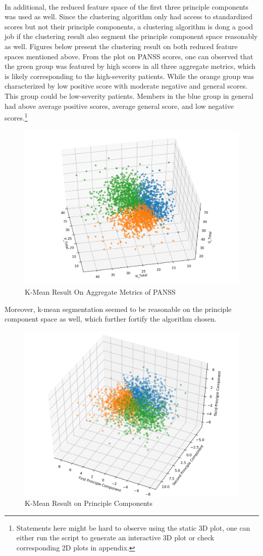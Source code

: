 \documentclass[11pt]{article}
\begin{document}
	\paragraph{} In additional, the reduced feature space of the first three principle components was used as well. Since the clustering algorithm only had access to standardized scores but not their principle components, a clustering algorithm is dong a good job if the clustering result also segment the principle component space reasonably as well. Figures below present the clustering result on both reduced feature spaces mentioned above. From the plot on PANSS scores, one can observed that the green group was featured by high scores in all three aggregate metrics, which is likely corresponding to the high-severity patients.	While the orange group was characterized by low positive score with moderate negative and general scores. This group could be low-severity patients. Members in the blue group in general had above average positive scores, average general score, and low negative scores.\footnote{Statements here might be hard to observe using the static 3D plot, one can either run the script to generate an interactive 3D plot or check corresponding 2D plots in appendix.}
	\begin{figure}[H]
		\centering
		\includegraphics[width=0.7\linewidth]{figures/kmean_3.png}
		\caption{K-Mean Result On Aggregate Metrics of PANSS}
	\end{figure}
	Moreover, k-mean segmentation seemed to be reasonable on the principle component space as well, which further fortify the algorithm chosen.
	\begin{figure}[H]
		\centering
		\includegraphics[width=0.7\linewidth]{figures/k_mean_on_pca.png}
		\caption{K-Mean Result on Principle Components}
	\end{figure}
	
\end{document}
